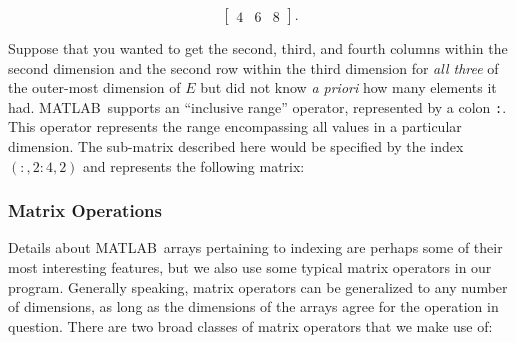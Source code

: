 \documentclass[11pt,conference]{IEEEtran}
\newcommand{\matlab}{MATLAB}
\theoremstyle{plain} %
\theoremstyle{definition}
\theoremstyle{remark}
\begin{document}
\begin{equation*}
    \begin{bmatrix}
        4 & 6 & 8
    \end{bmatrix}.
\end{equation*}

Suppose that you wanted to get the second, third, and fourth columns within the
second dimension and the second row within the third dimension for \emph{all
three} of the outer-most dimension of \(E\) but did not know \textit{a priori}
how many elements it had. \matlab\ supports an ``inclusive range'' operator,
represented by a colon \texttt{:}. This operator represents the range
encompassing all values in a particular dimension. The sub-matrix described here
would be specified by the index $(:, 2:4, 2)$ and represents the following
matrix:

\begin{center}
\end{center}

\subsubsection{Matrix Operations}\label{S:matrix_operations}

Details about \matlab\ arrays pertaining to indexing are perhaps some of their
most interesting features, but we also use some typical matrix operators in our
program. Generally speaking, matrix operators can be generalized to any number
of dimensions, as long as the dimensions of the arrays agree for the operation
in question. There are two broad classes of matrix operators that we make use
of:
\end{document}
